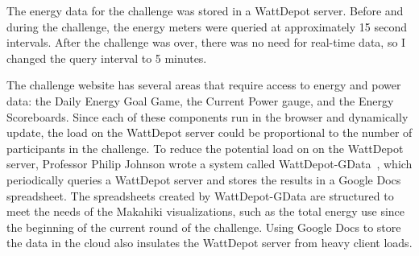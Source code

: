 The energy data for the challenge was stored in a WattDepot server. Before and during the challenge, the energy meters were queried at approximately 15 second intervals. After the challenge was over, there was no need for real-time data, so I changed the query interval to 5 minutes.

The challenge website has several areas that require access to energy and power data: the Daily Energy Goal Game, the Current Power gauge, and the Energy Scoreboards. Since each of these components run in the browser and dynamically update, the load on the WattDepot server could be proportional to the number of participants in the challenge. To reduce the potential load on on the WattDepot server, Professor Philip Johnson wrote a system called WattDepot-GData~\cite{wattdepot-gdata}, which periodically queries a WattDepot server and stores the results in a Google Docs spreadsheet. The spreadsheets created by WattDepot-GData are structured to meet the needs of the Makahiki visualizations, such as the total energy use since the beginning of the current round of the challenge. Using Google Docs to store the data in the cloud also insulates the WattDepot server from heavy client loads.
